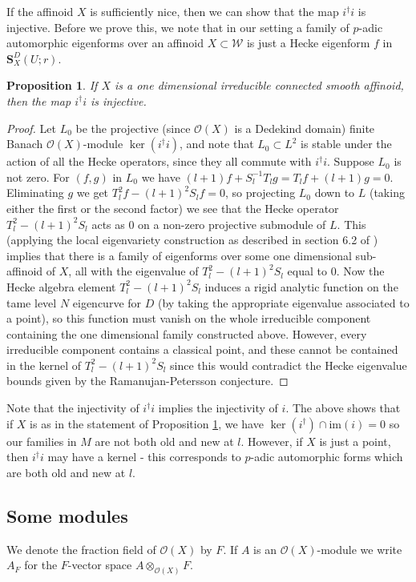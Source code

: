 \documentclass[a4paper, notitlepage]{amsart}
\newcommand{\OO}{\ensuremath{\mathscr{O}}\xspace}
\newtheorem{proposition}[theorem]{Proposition}
\newcommand{\OC}{\ensuremath{\mathbf{S}^D_{X}(U;r)}\xspace}
\begin{document}
If the affinoid $X$ is sufficiently nice, then we can show that the map $i^\dagger i$ is injective. Before we prove this, we note that in our setting a family of $p$-adic automorphic eigenforms over an affinoid $X \subset \mathscr{W}$ is just a Hecke eigenform $f$ in $\OC$.
\begin{proposition}\label{propinj} If $X$ is a one dimensional irreducible connected smooth affinoid, then the map $i^\dagger i$ is injective. \end{proposition}
\begin{proof}
Let $L_0$ be the projective (since $\OO(X)$ is a Dedekind domain) finite Banach $\OO(X)$-module $\ker(i^\dagger i)$, and note that $L_0\subset L^2$ is stable under the action of all the Hecke operators, since they all commute with $i^\dagger i$. Suppose $L_0$ is not zero. For $(f,g)$ in $L_0$ we have $(l+1)f+S_l^{-1}T_l g=T_l f+(l+1)g=0$. Eliminating $g$ we get $T_l^2 f-(l+1)^2 S_l f=0$, so projecting $L_0$ down to $L$ (taking either the first or the second factor) we see that the Hecke operator $T_l^2-(l+1)^2 S_l$ acts as $0$ on a non-zero projective submodule of $L$. This (applying the local eigenvariety construction as described in section 6.2 of \cite{Chenun}) implies that there is a family of eigenforms over some one dimensional sub-affinoid of $X$, all with the eigenvalue of $T_l^2-(l+1)^2 S_l$ equal to $0$. Now the Hecke algebra element $T_l^2-(l+1)^2 S_l$ induces a rigid analytic function on the tame level $N$ eigencurve for $D$ (by taking the appropriate eigenvalue associated to a point), so this function must vanish on the whole irreducible component containing the one dimensional family constructed above.  However, every irreducible component contains a classical point, and these cannot be contained in the kernel of $T_l^2-(l+1)^2 S_l$ since this would contradict the Hecke eigenvalue bounds given by the Ramanujan-Petersson conjecture. \end{proof}

Note that the injectivity of $i^\dagger i$ implies the injectivity of $i$. The above shows that if $X$ is as in the statement of Proposition \ref{propinj}, we have $\ker(i^\dagger)\cap \mathrm{im}(i)=0$ so our families in $M$ are not both old and new at $l$. However, if $X$ is just a point, then $i^\dagger i$ may have a kernel - this corresponds to $p$-adic automorphic forms which are both old and new at $l$.

\subsection{Some modules}\label{somemodules}
We denote the fraction field of $\OO(X)$ by $F$. If $A$ is an $\OO(X)$-module we write $A_F$ for the $F$-vector space $A\otimes_{\OO(X)}F$.
\end{document}
